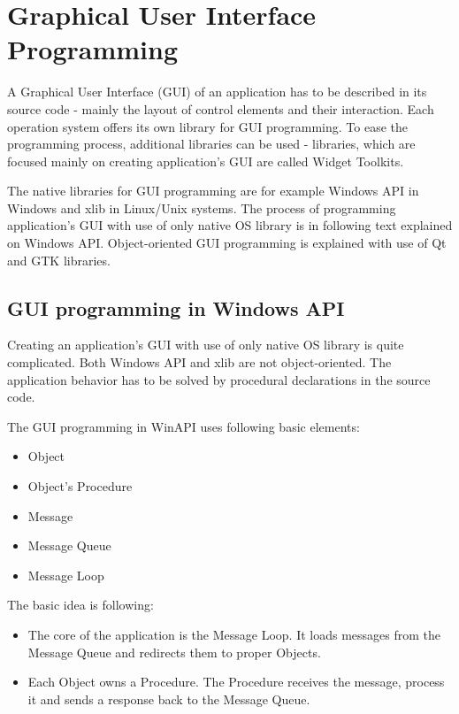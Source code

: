 \chapter{Graphical User Interface Programming}
\vspace{-10mm}

A Graphical User Interface (GUI) of an application has to be described in its source code - mainly the layout of control elements and their interaction. Each operation system offers its own library for GUI programming. To ease the programming process, additional libraries can be used - libraries, which are focused mainly on creating application's GUI are called Widget Toolkits.

The native libraries for GUI programming are for example Windows API in Windows and xlib in Linux/Unix systems. The process of programming application's GUI with use of only native OS library is in following text explained on Windows API. Object-oriented GUI programming is explained with use of Qt and GTK libraries.

\section{GUI programming in Windows API}
\label{noqt}
Creating an application's GUI with use of only native OS library is quite complicated. Both Windows API and xlib are not object-oriented. The application behavior has to be solved by procedural declarations in the source code.

The GUI programming in WinAPI uses following basic elements\cite[Chapter~2]{eventloopprogramming}:

\begin{itemize}
\item Object
\item Object's Procedure
\item Message
\item Message Queue
\item Message Loop
\end{itemize}

The basic idea is following:

\begin{itemize}
\item The core of the application is the Message Loop. It loads messages from the Message Queue and redirects them to proper Objects.
\item Each Object owns a Procedure. The Procedure receives the message, process it and sends a response back to the Message Queue.
\end{itemize}

